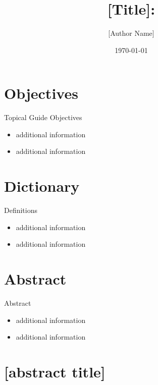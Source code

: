 \documentclass{beamer}
\title{[Title]: \\[Subtitle]}
\author{[Author Name]}
\date{\today}
\begin{document}
\frame{\titlepage}


\section{Objectives}
\begin{frame}{Topical Guide Objectives}
  \begin{itemize}
    \item<1-> additional information
    \item<2-> additional information
  \end{itemize}
\end{frame}


\section{Dictionary}
\begin{frame}{Definitions}
  \begin{itemize}
    \item<1-> additional information
    \item<2-> additional information
  \end{itemize}
\end{frame}


\section{Abstract}
\begin{frame}{Abstract}
  \begin{itemize}
    \item<1-> additional information
    \item<2-> additional information
  \end{itemize}
\end{frame}


\section{[abstract title]}
\end{document}
